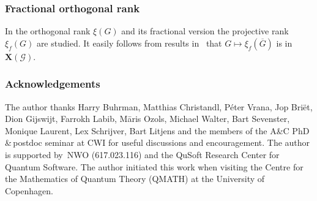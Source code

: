 \documentclass[a4paper, fleqn]{amsart}
\theoremstyle{plain}
\theoremstyle{definition}
\newcommand{\graphs}{\mathcal{G}}
\newcommand{\aspec}{\mathbf{X}}
\begin{document}
\subsubsection{Fractional orthogonal rank}



%

In \cite{cubitt2014bounds} the orthogonal rank $\xi(G)$ and its fractional version the projective rank $\xi_f(G)$ are studied. 
It easily follows from results in~\cite{cubitt2014bounds} that %
%
%
%
$G\mapsto \xi_f(\overline{G})$ is in $\aspec(\graphs)$.
%



%
%
%
%
%
%
%
%
%
%
%
%
%
%
%
%
%
%
%
%
%
%
%
%
%
%
%
%
%
%
%
%
%
%
%
%
%
%
%
%
%
%
%
%
%
%
%
%
%
%
%
%
%
%
%
%
%
%
%
%
%
%
%
%
%
%
%
%
%
%
%
%
%
%
%
%
%
%
%
%
%
%

\subsubsection*{\upshape\bfseries Acknowledgements}
The author thanks Harry Buhrman, Matthias Christandl, Péter Vrana, Jop Briët, Dion Gijswijt, Farrokh Labib, Māris Ozols, Michael Walter, Bart Sevenster, Monique Laurent, Lex Schrijver, Bart Litjens and the members of the A\&C PhD\,\&\,postdoc seminar at CWI for useful discussions and encouragement. The author is supported by~NWO (617.023.116) and the QuSoft Research Center for Quantum Software. The author initiated this work when visiting the Centre for the Mathematics of Quantum Theory (QMATH) at the University of Copenhagen.

\raggedright

%
\end{document}

